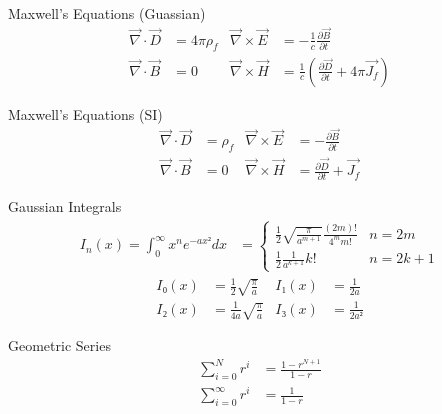 \documentclass[avery5371]{flashcards}
\begin{document}


\begin{flashcard}{Maxwell's Equations (Guassian)}
	\begin{align*}
		\vec ∇ · \vec D &= 4πρ_f
			& \vec ∇ × \vec E &= -\frac 1c \frac{∂\vec B}{∂t}
		\\
		\vec ∇ · \vec B &= 0
			& \vec ∇ × \vec H &= \frac 1c ( \frac{∂\vec D}{∂t} + 4π \vec{J_f} )
	\end{align*}
\end{flashcard}

\begin{flashcard}{Maxwell's Equations (SI)}
	\begin{align*}
		\vec ∇ · \vec D &= ρ_f
			& \vec ∇ × \vec E &= -\frac{∂\vec B}{∂t}
		\\
		\vec ∇ · \vec B &= 0
			& \vec ∇ × \vec H &= \frac{∂\vec D}{∂t} + \vec{J_f}
	\end{align*}
\end{flashcard}


\begin{flashcard}{Gaussian Integrals}
	\begin{align*}
		I_n(x) = \!\! ∫_0^∞ \!\! x^n e^{-ax²} dx &=
			\begin{cases}
				\displaystyle
				\frac{1}{2} \sqrt{\frac{π}{a^{m+1}}} \frac{(2m)!}{4^m m!}
					& \text{$n = 2m$} \\
				\displaystyle
				\frac{1}{2} \frac{1}{a^{k+1}} k!
					& \text{$n = 2k + 1$}
			\end{cases}
	\end{align*}
	\vspace{-\baselineskip}
	\begin{align*}
		I₀(x) &= \frac 12 \sqrt{\frac π a}
			& I₁(x) &= \frac 1 {2a} \\
		I₂(x) &= \frac{1}{4a} \sqrt{\frac π a}
			& I₃(x) &= \frac 1 {2a²}
	\end{align*}
\end{flashcard}

\begin{flashcard}{Geometric Series}
	\begin{align*}
		\sum_{i=0}^N r^i &= \frac{1 - r^{N+1}}{1 - r} \\
		\sum_{i=0}^∞ r^i &= \frac{1}{1 - r}
	\end{align*}
\end{flashcard}
\end{document}
